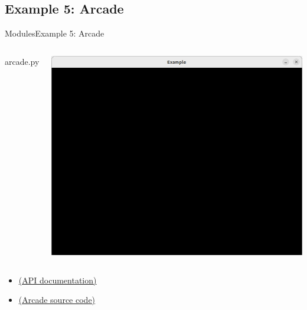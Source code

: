 \documentclass[10pt,compress]{beamer} %
\begin{document}
\subsection{Example 5: Arcade}
\begin{frame}{Modules}{Example 5: Arcade}
	\begin{columns}

		\vspace{-0.2cm}
		\begin{exampleblock}{arcade.py}
		\vspace{-0.2cm}
		
		\vspace{-0.2cm}
		\end{exampleblock}

		\vspace{-0.2cm}
		\centering \includegraphics[width=\linewidth]{figs/window.png}\\
		\vspace{-0.2cm}
	\end{columns}

	\begin{itemize}
		\item \href{https://api.arcade.academy/en/latest/api_docs/arcade.html}{(API documentation)}
		\item \href{https://github.com/pythonarcade/arcade/tree/development}{(Arcade source code)}
	\end{itemize}
\end{frame}
\end{document}
